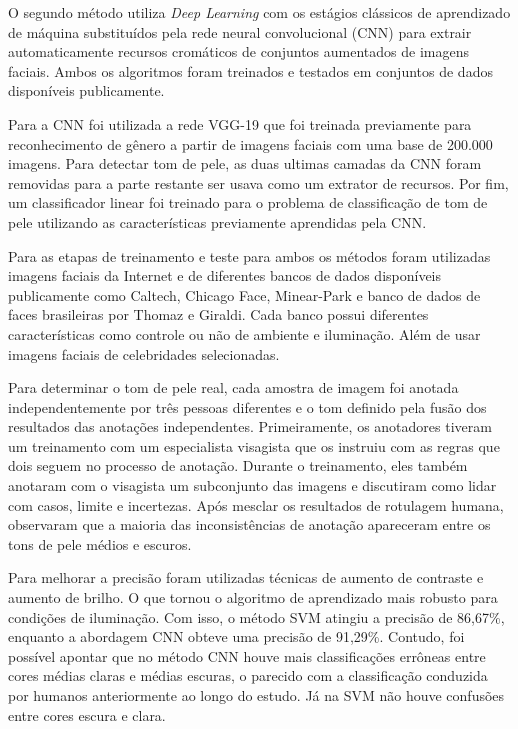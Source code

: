 O segundo método utiliza \textit{Deep Learning} com os estágios clássicos de aprendizado de máquina substituídos
pela rede neural convolucional (CNN) para extrair automaticamente recursos cromáticos de conjuntos aumentados de imagens faciais. Ambos os algoritmos foram treinados e testados em conjuntos de dados disponíveis publicamente. 

Para a CNN foi utilizada a rede VGG-19 que foi treinada previamente para reconhecimento de gênero a partir de imagens faciais com uma base de 200.000 imagens. Para detectar tom de pele, as duas ultimas camadas da CNN foram removidas para a parte restante ser usava como um extrator de recursos. Por fim, um classificador linear foi treinado para o problema de classificação de tom de pele utilizando as características previamente aprendidas pela CNN.

Para as etapas de treinamento e teste para ambos os métodos foram utilizadas imagens faciais da Internet e de diferentes bancos de dados disponíveis publicamente como Caltech, Chicago Face, Minear-Park e banco de dados de faces brasileiras por Thomaz e Giraldi. Cada banco possui diferentes características como controle ou não de ambiente e iluminação. Além de usar imagens faciais de celebridades selecionadas.

Para determinar o tom de pele real, cada amostra de imagem foi anotada independentemente por três pessoas
diferentes e o tom definido pela fusão dos resultados das anotações independentes. Primeiramente, os anotadores tiveram um treinamento com um especialista visagista que os instruiu com as regras que dois seguem no processo de anotação. Durante o treinamento, eles também anotaram com o visagista um subconjunto das imagens e discutiram como lidar com casos, limite e incertezas. Após mesclar os resultados de rotulagem humana, observaram que a maioria das
inconsistências de anotação apareceram entre os tons de pele médios e escuros.

Para melhorar a precisão foram utilizadas técnicas de aumento de contraste e aumento de brilho. O que tornou o algoritmo de aprendizado mais robusto para condições de iluminação. Com isso, o método SVM atingiu a precisão de 86,67\%, enquanto a abordagem CNN obteve uma precisão de 91,29\%. Contudo, foi possível apontar que no método CNN houve mais classificações errôneas entre cores médias claras e médias escuras, o parecido com a classificação conduzida por humanos anteriormente ao longo do estudo. Já na SVM não houve confusões entre cores escura e clara.

